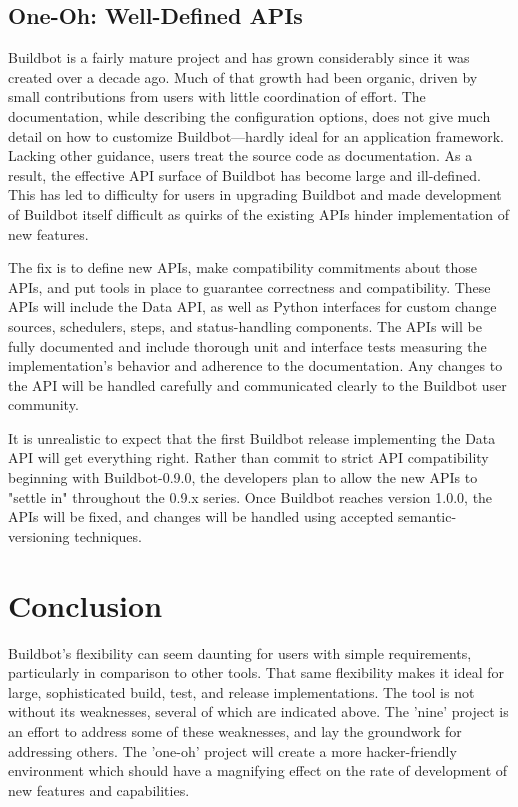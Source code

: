 \documentclass[conference]{IEEEtran}
\begin{document}
\subsection{One-Oh: Well-Defined APIs}

Buildbot is a fairly mature project and has grown considerably since it was created over a decade ago.
Much of that growth had been organic, driven by small contributions from users with little coordination of effort.
The documentation, while describing the configuration options, does not give much detail on how to customize Buildbot---hardly ideal for an application framework.
Lacking other guidance, users treat the source code as documentation.
As a result, the effective API surface of Buildbot has become large and ill-defined.
This has led to difficulty for users in upgrading Buildbot and made development of Buildbot itself difficult as quirks of the existing APIs hinder implementation of new features.

The fix is to define new APIs, make compatibility commitments about those APIs, and put tools in place to guarantee correctness and compatibility.
These APIs will include the Data API, as well as Python interfaces for custom change sources, schedulers, steps, and status-handling components.
The APIs will be fully documented and include thorough unit and interface tests measuring the implementation's behavior and adherence to the documentation.
Any changes to the API will be handled carefully and communicated clearly to the Buildbot user community.

It is unrealistic to expect that the first Buildbot release implementing the Data API will get everything right.
Rather than commit to strict API compatibility beginning with Buildbot-0.9.0, the developers plan to allow the new APIs to "settle in" throughout the 0.9.x series.
Once Buildbot reaches version 1.0.0, the APIs will be fixed, and changes will be handled using accepted semantic-versioning techniques\cite{semver}.

\section{Conclusion}

Buildbot's flexibility can seem daunting for users with simple requirements, particularly in comparison to other tools.
That same flexibility makes it ideal for large, sophisticated build, test, and release implementations.
The tool is not without its weaknesses, several of which are indicated above.
The 'nine' project is an effort to address some of these weaknesses, and lay the groundwork for addressing others.
The 'one-oh' project will create a more hacker-friendly environment which should have a magnifying effect on the rate of development of new features and capabilities.
\end{document}
